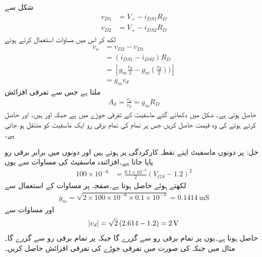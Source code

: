 شکل  سے 
\begin{align*}
v_{D1}&=V_{+} - i_{DS1} R_D\\
v_{D2}&=V_{+}-i_{DS2} R_D
\end{align*}
لکھ کر اس میں مساوات  استعمال کرتے ہوئے
\begin{align*}
v_o&=v_{D2}-v_{D1}\\
&=\left(i_{DS1}-i_{DS2} \right) R_D\\
&=\left[g_m \frac{v_d}{2}-g_m \left(\frac{v_d}{2} \right)) \right]\\
&=g_m v_d
\end{align*}
ملتا ہے جس سے تفرقی افزائش
\begin{align}\label{مساوات_تفرقی_بنیادی_جوڑے_کی_افزائش}
A_d=\frac{v_o}{v_d}=g_m R_D
\end{align}
حاصل ہوتی ہے۔
شکل  میں دکھائے گئے ماسفیٹ کے تفرقی جوڑے میں  ہے جبکہ  اور  ہیں۔ اور  حاصل کرتے ہوئے  کی وہ قیمت حاصل کریں جس پر تمام کی تمام برقی رو ایک ماسفیٹ کو منتقل ہو جاتی ہے۔

حل: پر دونوں ماسفیٹ اپنے نقطہ کارکردگی پر ہوتے ہیں اور دونوں میں برابر  برقی رو پایا جاتا ہے۔افزائندہ ماسفیٹ کی مساوات سے یوں
\begin{align*}
100 \times 10^{-6}&=\frac{0.1 \times 10^{-3}}{2} \left(V_{GS}-1.2 \right)^2
\end{align*}
لکھتے ہوئے  حاصل ہوتا ہے۔صفحہ  پر مساوات  کے استعمال سے
\begin{align*}
g_m=\sqrt{2 \times 100 \times 10^{-6} \times 0.1 \times 10^{-3}}=\SI{0.1414}{\milli \siemens}
\end{align*}
اور مساوات  سے
\begin{align*}
\abs{v_d}=\sqrt{2} \left(2.614-1.2 \right)=\SI{2}{\volt}
\end{align*}
حاصل ہوتا ہے۔یوں  پر تمام برقی رو  سے  گزرے گا جبکہ  پر تمام برقی رو  سے گزرے گا۔
مثال  میں  جبکہ  کی صورت میں تفرقی جوڑے  کی تفرقی افزائش حاصل کریں۔

